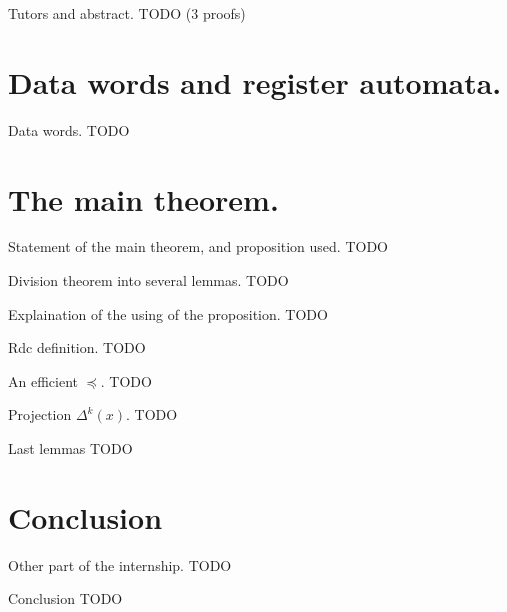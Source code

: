 \documentclass{beamer}
\begin{document}
\begin{frame}{Tutors and abstract.}
 TODO (3 proofs)
\end{frame}


\section{Data words and register automata.}
  
\begin{frame}{Data words.}
  TODO
\end{frame}



\section{The main theorem.}
\begin{frame}{Statement of the main theorem, and proposition used.}
 TODO
\end{frame}


\begin{frame}{Division theorem into several lemmas.}
 TODO
\end{frame}

\begin{frame}{Explaination of the using of the proposition.}
 TODO
\end{frame}

\begin{frame}{Rdc definition.}
 TODO
\end{frame}

\begin{frame}{An efficient $\preceq$.}
 TODO
\end{frame}


\begin{frame}{Projection $\Delta^k(x)$.}
 TODO
\end{frame}

\begin{frame}{Last lemmas}
  TODO
\end{frame}




\section{Conclusion}


\begin{frame}{Other part of the internship.}
 TODO
\end{frame}

\begin{frame} {Conclusion}
  TODO
\end{frame}
\end{document}
